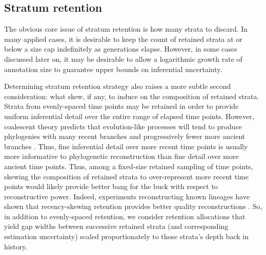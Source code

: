 

\subsection{Stratum retention}

The obvious core issue of stratum retention is how many strata to discard.
In many applied cases, it is desirable to keep the count of retained strata at or below a size cap indefinitely as generations elapse.
However, in some cases discussed later on, it may be desirable to allow a logarithmic growth rate of annotation size to guarantee upper bounds on inferential uncertainty.

Determining stratum retention strategy also raises a more subtle second consideration: what skew, if any, to induce on the composition of retained strata.
Strata from evenly-spaced time points may be retained in order to provide uniform inferential detail over the entire range of elapsed time points.
However, coalescent theory predicts that evolution-like processes will tend to produce phylogenies with many recent branches and progressively fewer more ancient branches \citep{nordborg2019coalescent, berestycki2009recent}.
Thus, fine inferential detail over more recent time points is usually more informative to phylogenetic reconstruction than fine detail over more ancient time points.
Thus, among a fixed-size retained sampling of time points, skewing the composition of retained strata to over-represent more recent time points would likely provide better bang for the buck with respect to reconstructive power.
Indeed, experiments reconstructing known lineages have shown that recency-skewing retention provides better quality reconstructions \citep{moreno2022hereditary}.
So, in addition to evenly-spaced retention, we consider retention allocations that yield gap widths between successive retained strata (and corresponding estimation uncertainty) scaled proportionately to those strata's depth back in history.

